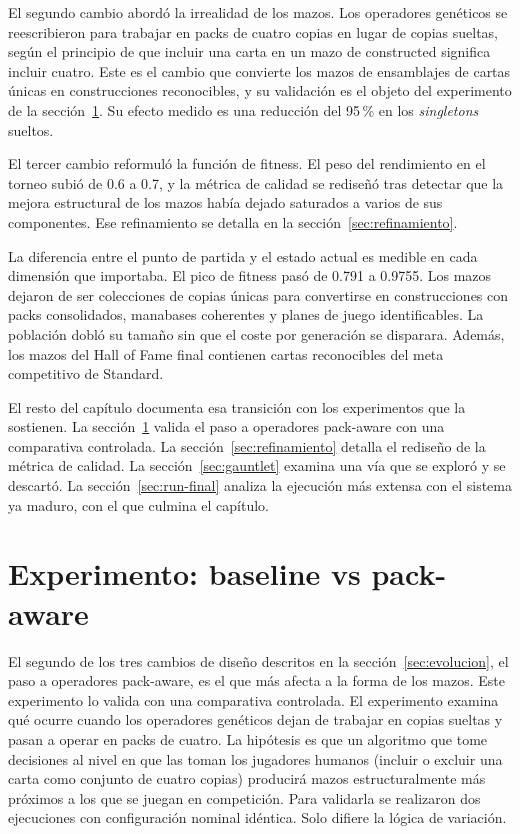 El segundo cambio abordó la irrealidad de los mazos. Los operadores genéticos se reescribieron para trabajar en packs de cuatro copias en lugar de copias sueltas, según el principio de que incluir una carta en un mazo de constructed significa incluir cuatro. Este es el cambio que convierte los mazos de ensamblajes de cartas únicas en construcciones reconocibles, y su validación es el objeto del experimento de la sección~\ref{sec:experimento-ab}. Su efecto medido es una reducción del 95\,\% en los \emph{singletons} sueltos.

El tercer cambio reformuló la función de fitness. El peso del rendimiento en el torneo subió de 0.6 a 0.7, y la métrica de calidad se rediseñó tras detectar que la mejora estructural de los mazos había dejado saturados a varios de sus componentes. Ese refinamiento se detalla en la sección~\ref{sec:refinamiento}.

La diferencia entre el punto de partida y el estado actual es medible en cada dimensión que importaba. El pico de fitness pasó de 0.791 a 0.9755. Los mazos dejaron de ser colecciones de copias únicas para convertirse en construcciones con packs consolidados, manabases coherentes y planes de juego identificables. La población dobló su tamaño sin que el coste por generación se disparara. Además, los mazos del Hall of Fame final contienen cartas reconocibles del meta competitivo de Standard.

El resto del capítulo documenta esa transición con los experimentos que la sostienen. La sección~\ref{sec:experimento-ab} valida el paso a operadores pack-aware con una comparativa controlada. La sección~\ref{sec:refinamiento} detalla el rediseño de la métrica de calidad. La sección~\ref{sec:gauntlet} examina una vía que se exploró y se descartó. La sección~\ref{sec:run-final} analiza la ejecución más extensa con el sistema ya maduro, con el que culmina el capítulo.

\section{Experimento: baseline vs pack-aware}
\label{sec:experimento-ab}

El segundo de los tres cambios de diseño descritos en la sección~\ref{sec:evolucion}, el paso a operadores pack-aware, es el que más afecta a la forma de los mazos. Este experimento lo valida con una comparativa controlada. El experimento examina qué ocurre cuando los operadores genéticos dejan de trabajar en copias sueltas y pasan a operar en packs de cuatro. La hipótesis es que un algoritmo que tome decisiones al nivel en que las toman los jugadores humanos (incluir o excluir una carta como conjunto de cuatro copias) producirá mazos estructuralmente más próximos a los que se juegan en competición. Para validarla se realizaron dos ejecuciones con configuración nominal idéntica. Solo difiere la lógica de variación.

